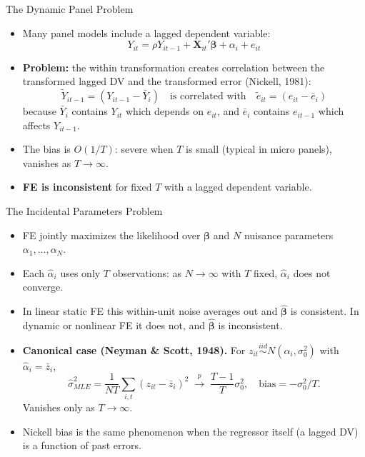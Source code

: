 \documentclass[aspectratio=169, handout, t]{beamer}
\numberwithin{equation}{section}
\begin{document}
\begin{frame}{The Dynamic Panel Problem}
\begin{itemize}
\item Many panel models include a lagged dependent variable:
$$Y_{it}=\rho Y_{it-1}+\bm{X}_{it}'\bm{\beta}+\alpha_i+e_{it}$$\pause
\item \textbf{Problem:} the within transformation creates correlation between the transformed lagged DV and the transformed error (Nickell, 1981):
$$\tilde{Y}_{it-1}=(Y_{it-1}-\bar{Y}_i) \quad\text{is correlated with}\quad \tilde{e}_{it}=(e_{it}-\bar{e}_i)$$
because $\bar{Y}_i$ contains $Y_{it}$ which depends on $e_{it}$, and $\bar{e}_i$ contains $e_{it-1}$ which affects $Y_{it-1}$.\pause
\item The bias is $O(1/T)$: severe when $T$ is small (typical in micro panels), vanishes as $T\to\infty$.
\item \textbf{FE is inconsistent} for fixed $T$ with a lagged dependent variable.
\end{itemize}
\end{frame}

\begin{frame}{The Incidental Parameters Problem}
\begin{itemize}
\item FE jointly maximizes the likelihood over $\bm{\beta}$ and $N$ nuisance parameters $\alpha_1,\ldots,\alpha_N$.
\item Each $\hat{\alpha}_i$ uses only $T$ observations: as $N\to\infty$ with $T$ fixed, $\hat{\alpha}_i$ does not converge.\pause
\item In linear static FE this within-unit noise averages out and $\hat{\bm{\beta}}$ is consistent. In dynamic or nonlinear FE it does not, and $\hat{\bm{\beta}}$ is inconsistent.\pause
\item \textbf{Canonical case (Neyman \& Scott, 1948).} For $z_{it}\stackrel{iid}{\sim}N(\alpha_i,\sigma_0^2)$ with $\hat{\alpha}_i=\bar{z}_i$,
\[
\hat{\sigma}^2_{MLE} = \frac{1}{NT}\sum_{i,t}(z_{it}-\bar{z}_i)^2
\;\xrightarrow{p}\;\frac{T-1}{T}\sigma_0^2,
\quad \text{bias}=-\sigma_0^2/T.
\]
Vanishes only as $T\to\infty$.\pause
\item Nickell bias is the same phenomenon when the regressor itself (a lagged DV) is a function of past errors.
\end{itemize}
\end{frame}
\end{document}

